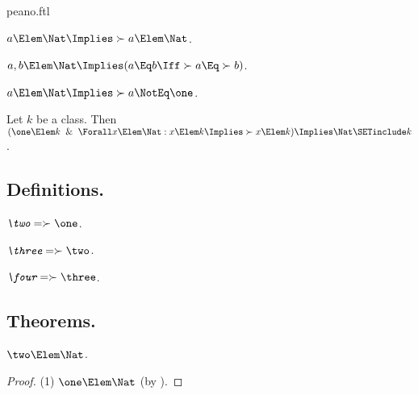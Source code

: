 \documentclass{stex}
\begin{document}
\begin{smodule}{peano.ftl}
\begin{forthel}
  \begin{axiom*}[title=6,name=P6]
    $a \Elem \Nat \Implies \succ{a} \Elem \Nat$.
  \end{axiom*}
  
  \begin{axiom*}[title=7,name=P7]
    $a,b \Elem \Nat \Implies (a \Eq b \Iff \succ{a} \Eq \succ{b})$.
  \end{axiom*}
  
  \begin{axiom*}[title=8,name=P8]
    $a \Elem \Nat \Implies \succ{a} \NotEq \one$.
  \end{axiom*}
  
  \begin{axiom*}[title=9,name=P9]
    Let $k$ be a class.
    Then $(\one \Elem k \And \Forall x \Elem \Nat: x \Elem k \Implies \succ{x} \Elem k) \Implies\linebreak \Nat \SETinclude k$.
  \end{axiom*}
\end{forthel}


\subsection{Definitions.}

\begin{forthel}
  \begin{definition*}[title=10.i,for=two]
    $\emph{\two} = \succ{\one}$.
  \end{definition*}

  \begin{definition*}[title=10.ii,for=three]
    $\emph{\three} = \succ{\two}$.
  \end{definition*}
  
  \begin{definition*}[title=10.iii,for=four]
    $\emph{\four} = \succ{\three}$.
  \end{definition*}
\end{forthel}


\subsection{Theorems.}


\begin{forthel}
  \begin{theorem*}[title=11,name=P11]
    $\two \Elem \Nat$.
  \end{theorem*}
  \begin{proof}
    (1) $\one \Elem \Nat$ (by ).


\end{proof}
\end{forthel}
\end{smodule}
\end{document}
